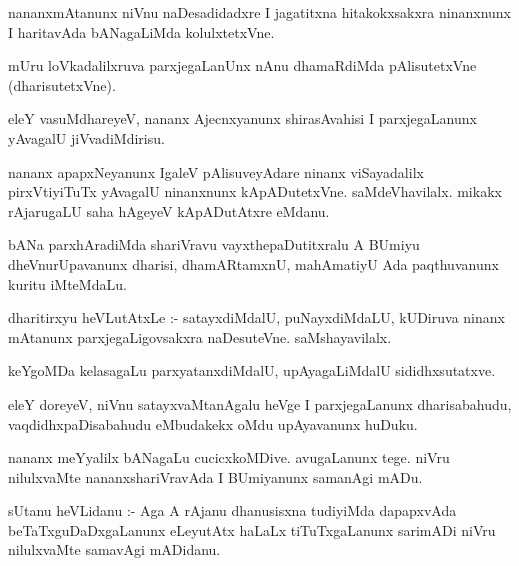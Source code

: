 \documentclass{article}
\begin{document}
\begin{mn}
nananxmAtanunx niVnu naDesadidadxre I jagatitxna hitakokxsakxra ninanxnunx 
I haritavAda bANagaLiMda kolulxtetxVne.
\end{mn}

\begin{mn}
mUru loVkadalilxruva parxjegaLanUnx nAnu dhamaRdiMda pAlisutetxVne (dharisutetxVne).
\end{mn}

\begin{mn}
eleY vasuMdhareyeV, nananx Ajecnxyanunx shirasAvahisi I parxjegaLanunx yAvagalU jiVvadiMdirisu. 
\end{mn}

\begin{mn}
nananx apapxNeyanunx IgaleV pAlisuveyAdare ninanx viSayadalilx pirxVtiyiTuTx yAvagalU 
ninanxnunx kApADutetxVne. saMdeVhavilalx. mikakx rAjarugaLU saha hAgeyeV kApADutAtxre eMdanu.
\end{mn}

\begin{mn}
bANa parxhAradiMda  shariVravu vayxthepaDutitxralu A BUmiyu dheVnurUpavanunx  
dharisi, dhamARtamxnU, mahAmatiyU Ada  paqthuvanunx kuritu iMteMdaLu.
\end{mn}

\begin{mn}
dharitirxyu heVLutAtxLe :- satayxdiMdalU, puNayxdiMdaLU, kUDiruva ninanx 
mAtanunx parxjegaLigovsakxra naDesuteVne.  saMshayavilalx. 
\end{mn}

\begin{mn}
keYgoMDa kelasagaLu parxyatanxdiMdalU,  upAyagaLiMdalU sididhxsutatxve.
\end{mn}

\begin{mn}
eleY doreyeV, niVnu satayxvaMtanAgalu heVge I parxjegaLanunx dharisabahudu, 
vaqdidhxpaDisabahudu eMbudakekx oMdu upAyavanunx huDuku.
\end{mn}

\begin{mn}
nananx meYyalilx bANagaLu cucicxkoMDive.  avugaLanunx tege. niVru nilulxvaMte 
nananxshariVravAda I BUmiyanunx samanAgi mADu. 
\end{mn}

\begin{mn}
sUtanu heVLidanu :- Aga A rAjanu dhanusisxna tudiyiMda dapapxvAda beTaTxguDaDxgaLanunx 
eLeyutAtx  haLaLx tiTuTxgaLanunx sarimADi niVru nilulxvaMte samavAgi mADidanu.
\end{mn}
\end{document}
